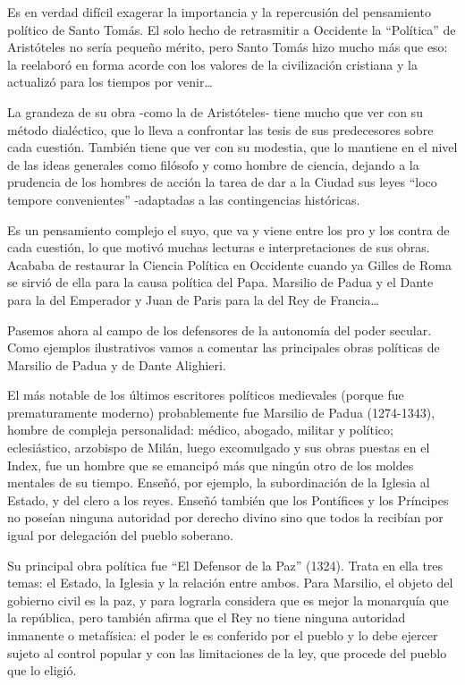\documentclass[
]{book}
\begin{document}
Es en verdad difícil exagerar la importancia y la repercusión del pensamiento político de Santo Tomás. El solo hecho de retrasmitir a Occidente la ``Política'' de Aristóteles no sería pequeño mérito, pero Santo Tomás hizo mucho más que eso: la reelaboró en forma acorde con los valores de la civilización cristiana y la actualizó para los tiempos por venir\ldots{}

La grandeza de su obra -como la de Aristóteles- tiene mucho que ver con su método dialéctico, que lo lleva a confrontar las tesis de sus predecesores sobre cada cuestión. También tiene que ver con su modestia, que lo mantiene en el nivel de las ideas generales como filósofo y como hombre de ciencia, dejando a la prudencia de los hombres de acción la tarea de dar a la Ciudad sus leyes ``loco tempore convenientes'' -adaptadas a las contingencias históricas.

Es un pensamiento complejo el suyo, que va y viene entre los pro y los contra de cada cuestión, lo que motivó muchas lecturas e interpretaciones de sus obras. Acababa de restaurar la Ciencia Política en Occidente cuando ya Gilles de Roma se sirvió de ella para la causa política del Papa. Marsilio de Padua y el Dante para la del Emperador y Juan de Paris para la del Rey de Francia\ldots{}

Pasemos ahora al campo de los defensores de la autonomía del poder secular. Como ejemplos ilustrativos vamos a comentar las principales obras políticas de Marsilio de Padua y de Dante Alighieri.

El más notable de los últimos escritores políticos medievales (porque fue prematuramente moderno) probablemente fue Marsilio de Padua (1274-1343), hombre de compleja personalidad: médico, abogado, militar y político; eclesiástico, arzobispo de Milán, luego excomulgado y sus obras puestas en el Index, fue un hombre que se emancipó más que ningún otro de los moldes mentales de su tiempo. Enseñó, por ejemplo, la subordinación de la Iglesia al Estado, y del clero a los reyes. Enseñó también que los Pontífices y los Príncipes no poseían ninguna autoridad por derecho divino sino que todos la recibían por igual por delegación del pueblo soberano.

Su principal obra política fue ``El Defensor de la Paz'' (1324). Trata en ella tres temas: el Estado, la Iglesia y la relación entre ambos. Para Marsilio, el objeto del gobierno civil es la paz, y para lograrla considera que es mejor la monarquía que la república, pero también afirma que el Rey no tiene ninguna autoridad inmanente o metafísica: el poder le es conferido por el pueblo y lo debe ejercer sujeto al control popular y con las limitaciones de la ley, que procede del pueblo que lo eligió.
\end{document}
